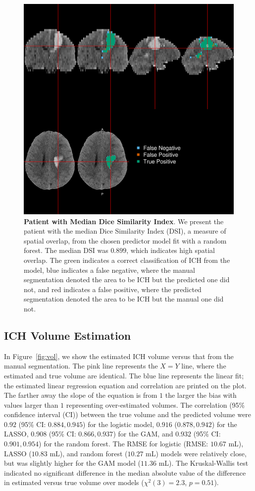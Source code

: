 \documentclass{elsarticle_nonatbib}\usepackage[]{graphicx}\usepackage[]{color}
\begin{document}
\begin{figure}
\centering
\includegraphics[width=0.75\linewidth,keepaspectratio]{Reseg_Figure_DSI_Quantile_050_native.png}
\caption{{\bf Patient with Median Dice Similarity Index}. We present the patient with the median Dice Similarity Index (DSI), a measure of spatial overlap, from the chosen predictor model fit with a random forest.  The median DSI was $0.899$, which indicates high spatial overlap. The green indicates a correct classification of ICH from the model, blue indicates a false negative, where the manual segmentation denoted the area to be ICH but the predicted one did not, and red indicates a false positive, where the predicted segmentation denoted the area to be ICH but the manual one did not. }
\label{fig:dice_img}
\end{figure}

\subsection{ICH Volume Estimation}
In Figure~\ref{fig:vol}, we show the estimated ICH volume versus that from the manual segmentation.  The pink line represents the $X = Y$ line, where the estimated and true volume are identical.  The blue line represents the linear fit; the estimated linear regression equation and correlation are printed on the plot.  The farther away the slope of the equation is from $1$ the larger the bias with values larger than $1$ representing over-estimated volumes.  
The correlation (95\% confidence interval (CI)) between the true volume and the predicted volume were $0.92$ (95\% CI: $0.884, 0.945$) for the logistic model, 
$0.916$ ($0.878, 0.942$) for the LASSO, 
$0.908$ (95\% CI: $0.866, 0.937$) for the GAM, and  
$0.932$ (95\% CI: $0.901, 0.954$) for the random forest.  The RMSE for logistic (RMSE: $10.67$ mL), LASSO ($10.83$ mL), and random forest ($10.27$ mL) models were relatively close, but was slightly higher for the GAM model ($11.36$ mL).  The  Kruskal-Wallis test indicated no significant difference in the median absolute value of the difference in estimated versus true volume over models ($\chi^{2}(3)=2.3$, $p = 0.51$).  
\end{document}
